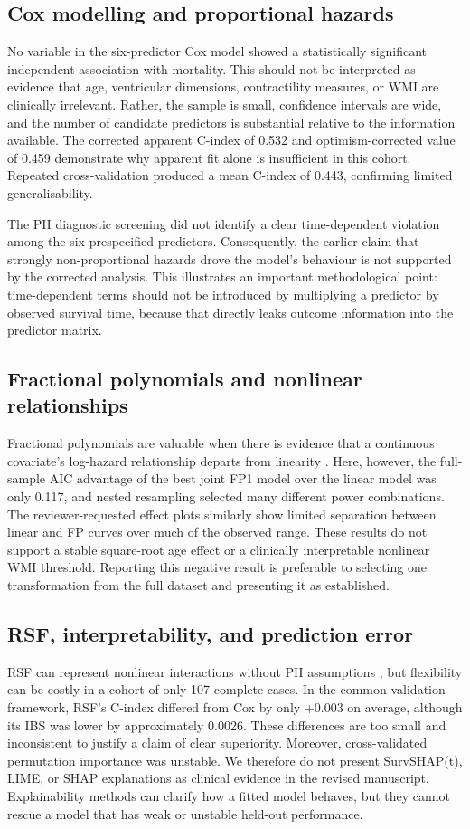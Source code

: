 \documentclass[a4paper,12pt]{article}
\begin{document}
\subsection{Cox modelling and proportional hazards}
No variable in the six-predictor Cox model showed a statistically significant independent association with mortality. This should not be interpreted as evidence that age, ventricular dimensions, contractility measures, or WMI are clinically irrelevant. Rather, the sample is small, confidence intervals are wide, and the number of candidate predictors is substantial relative to the information available. The corrected apparent C-index of 0.532 and optimism-corrected value of 0.459 demonstrate why apparent fit alone is insufficient in this cohort. Repeated cross-validation produced a mean C-index of 0.443, confirming limited generalisability.

The PH diagnostic screening did not identify a clear time-dependent violation among the six prespecified predictors. Consequently, the earlier claim that strongly non-proportional hazards drove the model's behaviour is not supported by the corrected analysis. This illustrates an important methodological point: time-dependent terms should not be introduced by multiplying a predictor by observed survival time, because that directly leaks outcome information into the predictor matrix.

\subsection{Fractional polynomials and nonlinear relationships}
Fractional polynomials are valuable when there is evidence that a continuous covariate's log-hazard relationship departs from linearity \cite{ref10,ref36}. Here, however, the full-sample AIC advantage of the best joint FP1 model over the linear model was only 0.117, and nested resampling selected many different power combinations. The reviewer-requested effect plots similarly show limited separation between linear and FP curves over much of the observed range. These results do not support a stable square-root age effect or a clinically interpretable nonlinear WMI threshold. Reporting this negative result is preferable to selecting one transformation from the full dataset and presenting it as established.

\subsection{RSF, interpretability, and prediction error}
RSF can represent nonlinear interactions without PH assumptions \cite{ref38}, but flexibility can be costly in a cohort of only 107 complete cases. In the common validation framework, RSF's C-index differed from Cox by only +0.003 on average, although its IBS was lower by approximately 0.0026. These differences are too small and inconsistent to justify a claim of clear superiority. Moreover, cross-validated permutation importance was unstable. We therefore do not present SurvSHAP(t), LIME, or SHAP explanations as clinical evidence in the revised manuscript. Explainability methods can clarify how a fitted model behaves, but they cannot rescue a model that has weak or unstable held-out performance.
\end{document}
